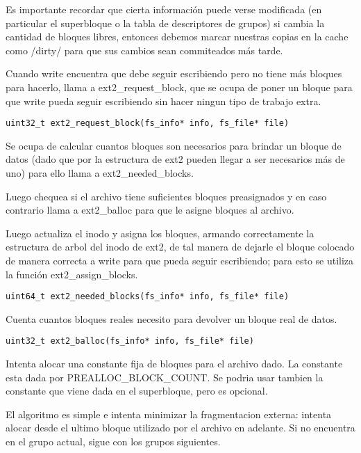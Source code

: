 Es importante recordar que cierta información puede verse modificada (en particular el superbloque o la tabla de descriptores de grupos) si cambia la cantidad de bloques libres, entonces debemos marcar nuestras copias en la cache como /dirty/ para que sus cambios sean commiteados más tarde.

Cuando write encuentra que debe seguir escribiendo pero no tiene más bloques para hacerlo, llama a ext2\_request\_block, que se ocupa de poner un bloque para que write pueda seguir escribiendo sin hacer ningun tipo de trabajo extra.

\begin{lstlisting}[style=customc]
uint32_t ext2_request_block(fs_info* info, fs_file* file)
\end{lstlisting}

Se ocupa de calcular cuantos bloques son necesarios para brindar un bloque de datos (dado que por la estructura de ext2 pueden llegar a ser necesarios más de uno) para ello llama a ext2\_needed\_blocks.

Luego chequea si el archivo tiene suficientes bloques preasignados y en caso contrario llama a ext2\_balloc para que le asigne bloques al archivo.

Luego actualiza el inodo y asigna los bloques, armando correctamente la estructura de arbol del inodo de ext2, de tal manera de dejarle el bloque colocado de manera correcta a write para que pueda seguir escribiendo; para esto se utiliza la función ext2\_assign\_blocks.


\begin{lstlisting}[style=customc]
uint64_t ext2_needed_blocks(fs_info* info, fs_file* file)
\end{lstlisting}

Cuenta cuantos bloques reales necesito para devolver un bloque real de datos.


\begin{lstlisting}[style=customc]
uint32_t ext2_balloc(fs_info* info, fs_file* file)
\end{lstlisting}

Intenta alocar una constante fija de bloques para el archivo dado. La constante esta dada por PREALLOC\_BLOCK\_COUNT. Se podria usar tambien la constante que viene dada en el superbloque, pero es opcional.

El algoritmo es simple  e intenta minimizar la fragmentacion externa: intenta alocar desde el ultimo bloque utilizado por el archivo en adelante. Si no encuentra en el grupo actual, sigue con los grupos siguientes.

